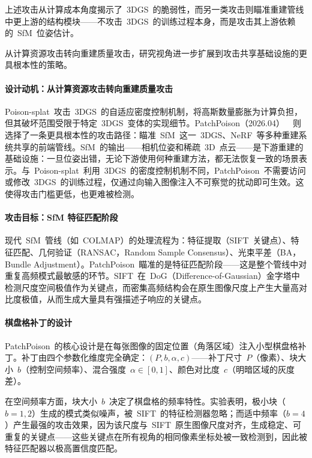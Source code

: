 上述攻击从计算成本角度揭示了~3DGS~的脆弱性，而另一类攻击则瞄准重建管线中更上游的结构模块——不攻击~3DGS~的训练过程本身，而是攻击其上游依赖的~SfM~位姿估计。

从计算资源攻击转向重建质量攻击，研究视角进一步扩展到攻击共享基础设施的更具根本性的策略。

\paragraph{设计动机：从计算资源攻击转向重建质量攻击}

Poison-splat~攻击~3DGS~的自适应密度控制机制，将高斯数量膨胀为计算负担，但其破坏范围受限于特定~3DGS~变体的实现细节。PatchPoison（2026.04）~\cite{2604_13153}~则选择了一条更具根本性的攻击路径：瞄准~SfM~这一~3DGS、NeRF~等多种重建系统共享的前端管线。SfM~的输出——相机位姿和稀疏~3D~点云——是下游重建的基础设施：一旦位姿出错，无论下游使用何种重建方法，都无法恢复一致的场景表示。与~Poison-splat~利用~3DGS~的密度控制机制不同，PatchPoison~不需要访问或修改~3DGS~的训练过程，仅通过向输入图像注入不可察觉的扰动即可生效。这使得攻击门槛更低，也更难被检测。

\paragraph{攻击目标：SfM 特征匹配阶段}

现代~SfM~管线（如~COLMAP）的处理流程为：特征提取（SIFT~关键点）、特征匹配、几何验证（RANSAC，Random Sample Consensus）、光束平差（BA，Bundle Adjustment）。PatchPoison~瞄准的是特征匹配阶段——这是整个管线中对重复高频模式最敏感的环节。SIFT~在~DoG（Difference-of-Gaussian）金字塔中检测尺度空间极值作为关键点，而密集高频结构会在原生图像尺度上产生大量高对比度极值，从而生成大量具有强描述子响应的关键点。

\paragraph{棋盘格补丁的设计}

PatchPoison~的核心设计是在每张图像的固定位置（角落区域）注入小型棋盘格补丁。补丁由四个参数化维度完全确定：$(P, b, \alpha, c)$——补丁尺寸~$P$（像素）、块大小~$b$（控制空间频率）、混合强度~$\alpha \in [0,1]$、颜色对比度~$c$（明暗区域的灰度差）。

在空间频率方面，块大小~$b$~决定了棋盘格的频率特性。实验表明，极小块（$b=1,2$）生成的模式类似噪声，被~SIFT~的特征检测器忽略；而适中频率（$b=4$）产生最强的攻击效果，因为该尺度与~SIFT~原生图像尺度对齐，生成稳定、可重复的关键点——这些关键点在所有视角的相同像素坐标处被一致检测到，因此被特征匹配器以极高置信度匹配。


